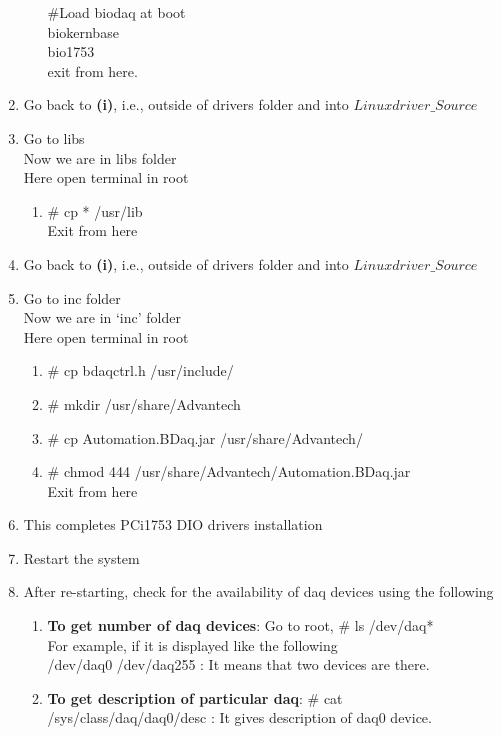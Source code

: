 \begin{enumerate}
\begin{enumerate}
			$\#$Load biodaq at boot\\
			biokernbase\\
			bio1753\\
			exit from here.
		\end{enumerate}
	\item [\textbullet] Go back to \textbf{(i)}, i.e., outside of drivers folder and into $Linuxdriver\_Source$
	\item [\textbullet] Go to libs\\
	Now we are in libs folder \\
	Here open terminal in root \\
	\begin{enumerate}
		\item $\#$ cp * /usr/lib \\
		Exit from here
	\end{enumerate}
	\item [\textbullet] Go back to \textbf{(i)}, i.e., outside of drivers folder and into $Linuxdriver\_Source$
	\item [\textbullet] Go to inc folder \\
	Now we are in `inc' folder \\
	Here open terminal in root 
		\begin{enumerate}
			\item $\#$ cp bdaqctrl.h /usr/include/
			\item $\#$ mkdir /usr/share/Advantech
			\item $\#$ cp Automation.BDaq.jar /usr/share/Advantech/
			\item $\#$ chmod 444 /usr/share/Advantech/Automation.BDaq.jar \\
			Exit from here
		\end{enumerate}
	\item [\textbullet] This completes PCi1753 DIO drivers installation
	\item [\textbullet] Restart the system
	\item [\textbullet] After re-starting, check for the availability of daq devices using the following 
	\begin{enumerate}
		\item \textbf{To get number of daq devices}: Go to root,  $\#$ ls /dev/daq* \\
		For example, if it is displayed like the following\\
		/dev/daq0             /dev/daq255   : It means that two devices are there.
		\item \textbf{To get description of particular daq}:
		$\#$ cat /sys/class/daq/daq0/desc   : It gives description of daq0 device.
	\end{enumerate}
	
\end{enumerate}

